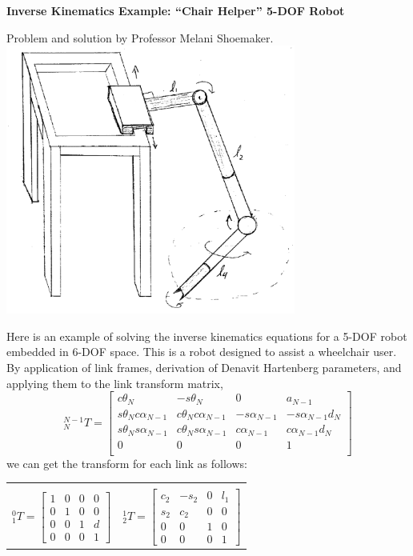 \begin{Example}
{\bf Inverse Kinematics Example: ``Chair Helper'' 5-DOF Robot}

Problem and solution by Professor Melani Shoemaker.\\[0.25in]

\includegraphics[width=3.75in]{figs04/00441.eps}

Here is an example of solving the inverse kinematics equations for a 5-DOF robot embedded in 6-DOF space.
This is a robot designed to assist a wheelchair user.
By application of link frames, derivation of Denavit Hartenberg parameters, and applying them to the link
transform matrix,
\[
^{N-1}_NT = \left[
\begin{array}{cccc}
c\theta_N                 & -s\theta_N                    & 0               & a_{N-1} \\
s\theta_Nc\alpha_{N-1}    & c\theta_Nc\alpha_{N-1}        & -s\alpha_{N-1}  & -s\alpha_{N-1}d_N \\
s\theta_Ns\alpha_{N-1}    & c\theta_Ns\alpha_{N-1}        &  c\alpha_{N-1}  & c\alpha_{N-1}d_N  \\
0                         & 0                             &  0              & 1                 \\
\end{array}
\right]
\]
we can get the  transform for each link as follows:

\begin{tabular}{ll}
 &  \\
%
%
$
^0_1T=\left[
\begin{array}{cccc}
1 & 0 & 0 & 0 \\
0 & 1 & 0 & 0 \\
0 & 0 & 1 & d \\
0 & 0 & 0 & 1
\end{array}
\right]
$
&
%
%
$
^1_2T=\left[
\begin{array}{cccc}
c_2 & -s_2 & 0 & l_1 \\
s_2 & c_2 & 0 & 0 \\
0 & 0 & 1 & 0 \\
0  & 0 & 0 & 1
\end{array}
\right]
$


\end{tabular}
\end{Example}
